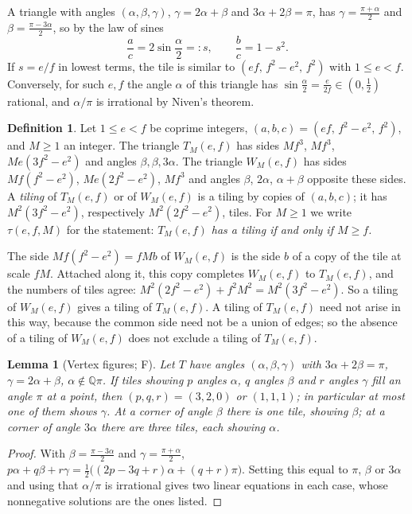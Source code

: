 \documentclass[11pt,reqno]{amsart}
\theoremstyle{plain}
\newtheorem{lemma}[theorem]{Lemma}
\theoremstyle{definition}
\newtheorem{definition}[theorem]{Definition}
\newcommand{\Q}{\mathbb{Q}}
\newcommand{\sF}{\textup{\textsf{F}}}
\begin{document}
A triangle with angles $(\alpha,\beta,\gamma)$, $\gamma=2\alpha+\beta$ and $3\alpha+2\beta=\pi$, has
$\gamma=\frac{\pi+\alpha}2$ and $\beta=\frac{\pi-3\alpha}2$, so by the law of sines
\[
\frac ac=2\sin\frac\alpha2=:s,\qquad \frac bc=1-s^2 .
\]
If $s=e/f$ in lowest terms, the tile is similar to $(ef,\,f^2-e^2,\,f^2)$ with $1\le e<f$. Conversely, for
such $e,f$ the angle $\alpha$ of this triangle has $\sin\frac\alpha2=\frac e{2f}\in(0,\frac12)$ rational,
and $\alpha/\pi$ is irrational by Niven's theorem.

\begin{definition}\label{def:TW}
Let $1\le e<f$ be coprime integers, $(a,b,c)=(ef,\,f^2-e^2,\,f^2)$, and $M\ge1$ an integer. The triangle
$T_M(e,f)$ has sides $Mf^3$, $Mf^3$, $Me(3f^2-e^2)$ and angles $\beta,\beta,3\alpha$. The triangle
$W_M(e,f)$ has sides $Mf(f^2-e^2)$, $Me(2f^2-e^2)$, $Mf^3$ and angles $\beta$, $2\alpha$, $\alpha+\beta$
opposite these sides. A \emph{tiling} of $T_M(e,f)$ or of $W_M(e,f)$ is a tiling by copies of $(a,b,c)$; it
has $M^2(3f^2-e^2)$, respectively $M^2(2f^2-e^2)$, tiles. For $M\ge1$ we write $\tau(e,f,M)$ for the
statement: \emph{$T_M(e,f)$ has a tiling if and only if $M\ge f$.}
\end{definition}

The side $Mf(f^2-e^2)=fMb$ of $W_M(e,f)$ is the side $b$ of a copy of the tile at scale $fM$. Attached
along it, this copy completes $W_M(e,f)$ to $T_M(e,f)$, and the numbers of tiles agree:
$M^2(2f^2-e^2)+f^2M^2=M^2(3f^2-e^2)$. So a tiling of $W_M(e,f)$ gives a tiling of $T_M(e,f)$. A tiling of
$T_M(e,f)$ need not arise in this way, because the common side need not be a union of edges; so the absence of a tiling of $W_M(e,f)$ does not exclude a tiling of
$T_M(e,f)$.

\begin{lemma}[Vertex figures; \sF]\label{lem:figures}
Let $T$ have angles $(\alpha,\beta,\gamma)$ with $3\alpha+2\beta=\pi$, $\gamma=2\alpha+\beta$,
$\alpha\notin\Q\pi$. If tiles showing $p$ angles $\alpha$, $q$ angles $\beta$ and $r$ angles $\gamma$ fill an
angle $\pi$ at a point, then $(p,q,r)=(3,2,0)$ or $(1,1,1)$; in particular at most one of them shows
$\gamma$. At a corner of angle $\beta$ there is one tile, showing $\beta$; at a corner of angle $3\alpha$
there are three tiles, each showing $\alpha$.
\end{lemma}

\begin{proof}
With $\beta=\frac{\pi-3\alpha}2$ and $\gamma=\frac{\pi+\alpha}2$,
$p\alpha+q\beta+r\gamma=\frac12\bigl((2p-3q+r)\alpha+(q+r)\pi\bigr)$. Setting this equal to $\pi$, $\beta$
or $3\alpha$ and using that $\alpha/\pi$ is irrational gives two linear equations in each case, whose
nonnegative solutions are the ones listed.
\end{proof}
\end{document}
